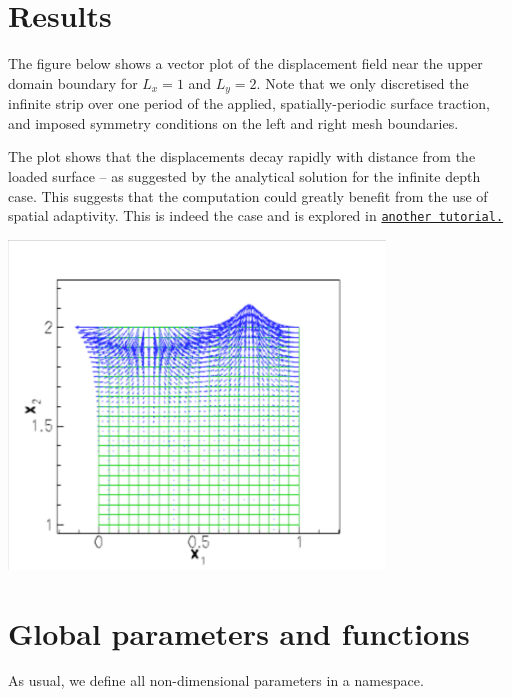 

\hypertarget{index_results}{}\section{Results}\label{index_results}
The figure below shows a vector plot of the displacement field near the upper domain boundary for $ L_x = 1 $ and $ L_y=2 $. Note that we only discretised the infinite strip over one period of the applied, spatially-\/periodic surface traction, and imposed symmetry conditions on the left and right mesh boundaries.

The plot shows that the displacements decay rapidly with distance from the loaded surface -- as suggested by the analytical solution for the infinite depth case. This suggests that the computation could greatly benefit from the use of spatial adaptivity. This is indeed the case and is explored in \href{../../refineable_periodic_load/html/index.html}{\tt another tutorial.}

 
\begin{DoxyImage}
\includegraphics[width=0.75\textwidth]{displ}
\end{DoxyImage}




 

\hypertarget{index_namespace}{}\section{Global parameters and functions}\label{index_namespace}
As usual, we define all non-\/dimensional parameters in a namespace.

